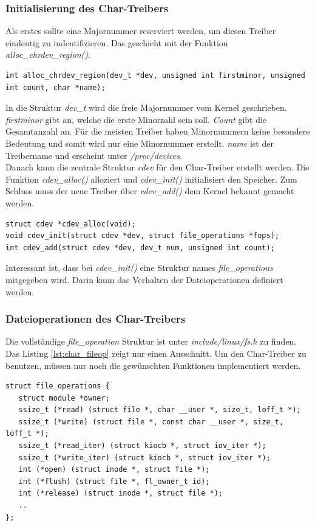 \subsubsection{Initialisierung des Char-Treibers}

Als erstes sollte eine Majornummer reserviert werden, um diesen Treiber eindeutig zu indentifizieren. Das geschieht mit der Funktion \emph{alloc\_chrdev\_region()}.
\begin{lstlisting}[caption=Majornummer registrieren für Char-Treiber]
int alloc_chrdev_region(dev_t *dev, unsigned int firstminor, unsigned int count, char *name);
\end{lstlisting}
In die Struktur \emph{dev\_t} wird die freie Majornummer vom Kernel geschrieben. \emph{firstminor} gibt an, welche die erste Minorzahl
sein soll. \emph{Count} gibt die Gesamtanzahl an. Für die meisten Treiber haben Minornummern keine besondere Bedeutung
und somit wird nur eine Minornummer erstellt. \emph{name} ist der Treibername und erscheint unter \emph{/proc/devices}. \\

Danach kann die zentrale Struktur \emph{cdev} für den Char-Treiber erstellt werden. Die Funktion \emph{cdev\_alloc()} alloziert und
\emph{cdev\_init()} initialisiert den Speicher. Zum Schluss muss der neue Treiber über \emph{cdev\_add()} dem Kernel bekannt gemacht
werden.
\begin{lstlisting}[caption=Funktion für den Char-Treiber]
struct cdev *cdev_alloc(void);
void cdev_init(struct cdev *dev, struct file_operations *fops);
int cdev_add(struct cdev *dev, dev_t num, unsigned int count);
\end{lstlisting}
Interessant ist, dass bei \emph{cdev\_init()} eine Struktur names \emph{file\_operations} mitgegeben wird. Darin kann das Verhalten der Dateioperationen
definiert werden.

\subsubsection{Dateioperationen des Char-Treibers}

Die vollständige \emph{file\_operation} Struktur ist unter \emph{include/linux/fs.h} zu finden. Das Listing \ref{lst:char_fileop} zeigt nur einen Ausschnitt. 
Um den Char-Treiber zu benutzen, müssen nur noch die gewünschten Funktionen implementiert werden.

\begin{lstlisting}[label=lst:char_fileop,caption=Dateioperationen]
struct file_operations {
   struct module *owner;
   ssize_t (*read) (struct file *, char __user *, size_t, loff_t *);
   ssize_t (*write) (struct file *, const char __user *, size_t, loff_t *);
   ssize_t (*read_iter) (struct kiocb *, struct iov_iter *);
   ssize_t (*write_iter) (struct kiocb *, struct iov_iter *);
   int (*open) (struct inode *, struct file *);
   int (*flush) (struct file *, fl_owner_t id);
   int (*release) (struct inode *, struct file *);
   ..
};
\end{lstlisting}

